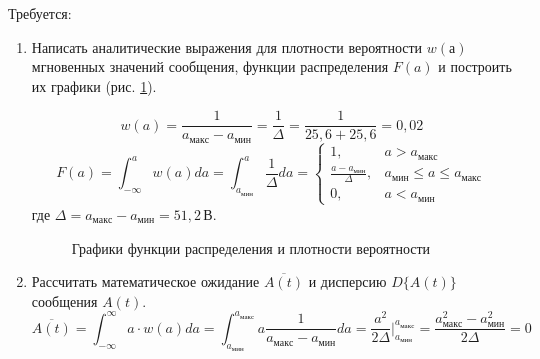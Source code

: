 \documentclass[a4paper, 12pt]{article}
\begin{document}
Требуется:
\begin{enumerate}
  \item Написать аналитические выражения для плотности вероятности 
  $w(а)$ мгновенных значений сообщения, функции распределения $F(a)$ и
  построить их графики (рис. \ref{fig:prob_plots}).

  \[ w(a)=\frac{1}{a_{макс}-a_{мин}}=\frac1\Delta=\frac{1}{25,6+25,6}=0,02 \]
  \[ F(a)=\int^a_{-\infty}w(a)da=
  \int^a_{a_{мин}}\frac{1}{\Delta}da=
  \begin{cases}
    1, & a > a_{макс}\\
    \frac{a-a_{мин}}{\Delta}, & a_{мин} \leq a \leq a_{макс}\\
    0, & a < a_{мин}
  \end{cases}\]
  где $\Delta = a_{макс}-a_{мин}=51,2\, В$.

  \begin{figure}[H]
    \centering
    \caption{Графики функции распределения и плотности вероятности}
    \label{fig:prob_plots}
  \end{figure}
  \item Рассчитать математическое ожидание $\overline{A(t)}$ и 
  дисперсию $D\{A(t)\}$ сообщения $A(t)$.
  \[ \overline{A(t)}=\int^\infty_{-\infty}a\cdot w(a)da=
  \int^{a_{макс}}_{a_{мин}}a \frac{1}{a_{макс}-a_{мин}} da=
  \frac{a^2}{2\Delta} \Biggr|^{a_{макс}}_{a_{мин}}\! =
  \frac{a_{макс}^2-a_{мин}^2}{2\Delta}=0 \]


\end{enumerate}
\end{document}
